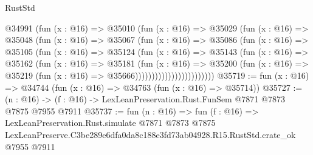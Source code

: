 \begin{lexlean}{RustStd}
\begin{coremodule}
                        @34991
                          (fun (x : @16) =>
                          @35010
                            (fun (x : @16) =>
                            @35029
                              (fun (x : @16) =>
                              @35048
                                (fun (x : @16) =>
                                @35067
                                  (fun (x : @16) =>
                                  @35086
                                    (fun (x : @16) =>
                                    @35105
                                      (fun (x : @16) =>
                                      @35124
                                        (fun (x : @16) =>
                                        @35143
                                          (fun (x : @16) =>
                                          @35162
                                            (fun (x : @16) =>
                                            @35181
                                              (fun (x : @16) =>
                                              @35200
                                                (fun (x : @16) =>
                                                @35219
                                                  (fun (x : @16) => @35666))))))))))))))))))))))))
@35719 := fun (x : @16) => @34744 (fun (x : @16) => @34763 (fun (x : @16) => @35714))
@35727 := (n : @16) -> (f : @16) -> LexLeanPreservation.Rust.FunSem @7871 @7873 @7875 @7955 @7911
@35737 := fun (n : @16) =>
  fun (f : @16) =>
  LexLeanPreservation.Rust.simulate
    @7871
    @7873
    @7875
    LexLeanPreserve.C3be289e6dfa0da8c188e3fd73ab04928.R15.RustStd.crate_ok
    @7955
    @7911
\end{coremodule}
\end{lexlean}
